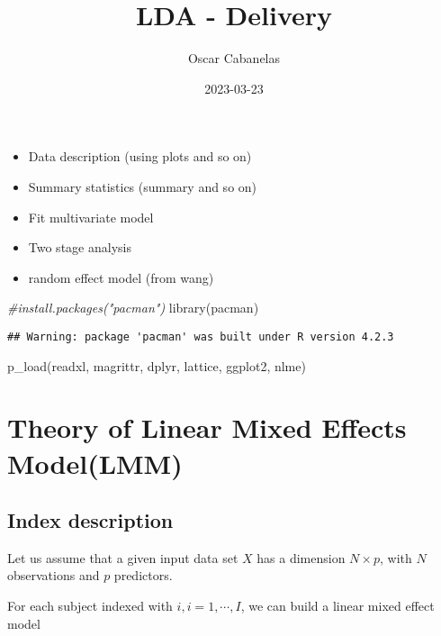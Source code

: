 \documentclass[
]{article}
\title{LDA - Delivery}
\author{Oscar Cabanelas}
\date{2023-03-23}
\newenvironment{Shaded}{\begin{snugshade}}{\end{snugshade}}
\newcommand{\CommentTok}[1]{\textcolor[rgb]{0.56,0.35,0.01}{\textit{#1}}}
\newcommand{\FunctionTok}[1]{\textcolor[rgb]{0.00,0.00,0.00}{#1}}
\newcommand{\NormalTok}[1]{#1}
\providecommand{\tightlist}{%
  \setlength{\itemsep}{0pt}\setlength{\parskip}{0pt}}
\begin{document}
\maketitle

\begin{itemize}
\tightlist
\item
  Data description (using plots and so on)
\item
  Summary statistics (summary and so on)
\item
  Fit multivariate model
\item
  Two stage analysis
\item
  random effect model (from wang)
\end{itemize}

\begin{Shaded}
\begin{Highlighting}[]
\CommentTok{\#install.packages("pacman")}
\FunctionTok{library}\NormalTok{(pacman)}
\end{Highlighting}
\end{Shaded}

\begin{verbatim}
## Warning: package 'pacman' was built under R version 4.2.3
\end{verbatim}

\begin{Shaded}
\begin{Highlighting}[]
\FunctionTok{p\_load}\NormalTok{(readxl, magrittr, dplyr, lattice, ggplot2, nlme)}
\end{Highlighting}
\end{Shaded}

\hypertarget{theory-of-linear-mixed-effects-modellmm}{%
\section{Theory of Linear Mixed Effects
Model(LMM)}\label{theory-of-linear-mixed-effects-modellmm}}

\hypertarget{index-description}{%
\subsection{Index description}\label{index-description}}

Let us assume that a given input data set \(X\) has a dimension
\(N \times p\), with \(N\) observations and \(p\) predictors.

For each subject indexed with \(i, i = 1,\cdots,I\), we can build a
linear mixed effect model
\end{document}

